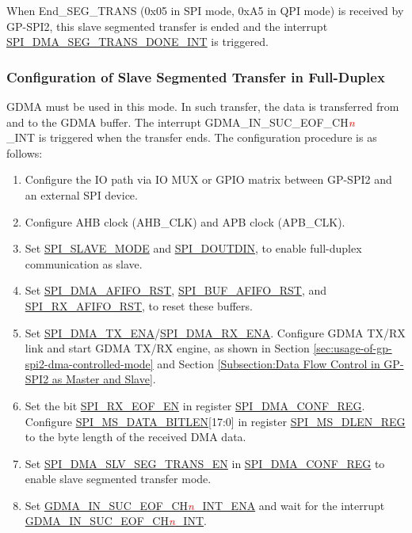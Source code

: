 \documentclass[main\_\_EN.tex]{subfiles}
\begin{document}
When End\_SEG\_TRANS (0x05 in SPI mode, 0xA5 in QPI mode) is received by GP-SPI2, this slave segmented transfer is ended and the interrupt \hyperref[int:SPIDMASEGTRANSDONEINT]{SPI\_DMA\_SEG\_TRANS\_DONE\_INT} is triggered.

\subsubsection{Configuration of Slave Segmented Transfer in Full-Duplex}\label{sec:gp-spi2-slave-fd-seg-trans}
GDMA must be used in this mode. In such transfer, the data is transferred from and to the GDMA buffer. The interrupt GDMA\_IN\_SUC\_EOF\_CH\textcolor{red}{\it{n}}\\\_INT is triggered when the transfer ends. The configuration procedure is as follows:

\begin{enumerate}
   \item Configure the IO path via IO MUX or GPIO matrix between GP-SPI2 and an external SPI device. 
   \item Configure AHB clock (AHB\_CLK) and APB clock (APB\_CLK).

    \item Set \hyperref[fielddesc:SPISLAVEMODE]{SPI\_SLAVE\_MODE} and \hyperref[fielddesc:SPIDOUTDIN]{SPI\_DOUTDIN}, to enable full-duplex communication as slave.
    
    \item Set \hyperref[fielddesc:SPIDMAAFIFORST]{SPI\_DMA\_AFIFO\_RST}, \hyperref[fielddesc:SPIBUFAFIFORST]{SPI\_BUF\_AFIFO\_RST}, and \hyperref[fielddesc:SPIRXAFIFORST]{SPI\_RX\_AFIFO\_RST}, to reset these buffers.
        
    \item Set \hyperref[fielddesc:SPIDMATXENA]{SPI\_DMA\_TX\_ENA}/\hyperref[fielddesc:SPIDMARXENA]{SPI\_DMA\_RX\_ENA}. Configure GDMA TX/RX link and start GDMA TX/RX engine, as shown in Section \ref{sec:usage-of-gp-spi2-dma-controlled-mode} and Section \ref{Subsection:Data Flow Control in GP-SPI2 as Master and Slave}.
    
    \item Set the bit \hyperref[fielddesc:SPIRXEOFEN]{SPI\_RX\_EOF\_EN} in register \hyperref[regdesc:SPIDMACONFREG]{SPI\_DMA\_CONF\_REG}. Configure \hyperref[fielddesc:SPIMSDATABITLEN]{SPI\_MS\_DATA\_BITLEN}[17:0] in register \hyperref[regdesc:SPIMSDLENREG]{SPI\_MS\_DLEN\_REG} to the byte length of the received DMA data.
    
    \item Set \hyperref[fielddesc:SPIDMASLVSEGTRANSEN]{SPI\_DMA\_SLV\_SEG\_TRANS\_EN} in \hyperref[regdesc:SPIDMACONFREG]{SPI\_DMA\_CONF\_REG} to enable slave segmented transfer mode.
    
    \item Set \hyperref[fielddesc:GDMAINSUCEOFCHNINTENA]{GDMA\_IN\_SUC\_EOF\_CH\textcolor{red}{\it{n}}\_INT\_ENA} and wait for the interrupt \hyperref[int:GDMAINSUCEOFINT]{GDMA\_IN\_SUC\_EOF\_CH\textcolor{red}{\it{n}}\_INT}.
\end{enumerate}
\end{document}
